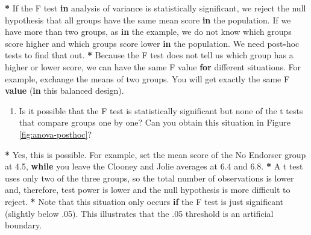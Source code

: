 \documentclass[a4paper]{book}
\newenvironment{Shaded}{\begin{snugshade}}{\end{snugshade}}
\newcommand{\KeywordTok}[1]{\textcolor[rgb]{0,0,0}{\textbf{#1}}}
\newcommand{\DecValTok}[1]{\textcolor[rgb]{0.00,0.00,0.00}{#1}}
\newcommand{\FloatTok}[1]{\textcolor[rgb]{0.00,0.00,0.00}{#1}}
\newcommand{\StringTok}[1]{\textcolor[rgb]{0.00,0.00,0.00}{#1}}
\newcommand{\ControlFlowTok}[1]{\textcolor[rgb]{0.00,0.00,0.00}{\textbf{#1}}}
\newcommand{\OperatorTok}[1]{\textcolor[rgb]{0.00,0.00,0.00}{\textbf{#1}}}
\newcommand{\NormalTok}[1]{#1}
\providecommand{\tightlist}{%
  \setlength{\itemsep}{0pt}\setlength{\parskip}{0pt}}
\theoremstyle{definition}
\theoremstyle{definition}
\theoremstyle{definition}
\theoremstyle{remark}
\begin{document}
\begin{Shaded}
\begin{Highlighting}[]
\OperatorTok{*}\StringTok{ }\NormalTok{If the F test }\ControlFlowTok{in}\NormalTok{ analysis of variance is statistically significant, we}
\NormalTok{reject the null hypothesis that all groups have the same mean score }\ControlFlowTok{in}\NormalTok{ the}
\NormalTok{population. If we have more than two groups, as }\ControlFlowTok{in}\NormalTok{ the example, we do not know}
\NormalTok{which groups score higher and which groups score lower }\ControlFlowTok{in}\NormalTok{ the population. We}
\NormalTok{need post}\OperatorTok{-}\NormalTok{hoc tests to find that out.}
\OperatorTok{*}\StringTok{ }\NormalTok{Because the F test does not tell us which group has a higher or lower score,}
\NormalTok{we can have the same F value }\ControlFlowTok{for}\NormalTok{ different situations. For example, exchange}
\NormalTok{the means of two groups. You will get exactly the same F }\KeywordTok{value}\NormalTok{ (}\ControlFlowTok{in}\NormalTok{ this}
\NormalTok{balanced design).}
\end{Highlighting}
\end{Shaded}

\begin{enumerate}
\def\labelenumi{\arabic{enumi}.}
\setcounter{enumi}{1}
\tightlist
\item
  Is it possible that the F test is statistically significant but none
  of the t tests that compare groups one by one? Can you obtain this
  situation in Figure \ref{fig:anova-posthoc}?
\end{enumerate}

\begin{Shaded}
\begin{Highlighting}[]
\OperatorTok{*}\StringTok{ }\NormalTok{Yes, this is possible. For example, set the mean score of the No Endorser}
\NormalTok{group at }\FloatTok{4.5}\NormalTok{, }\ControlFlowTok{while}\NormalTok{ you leave the Clooney and Jolie averages at }\FloatTok{6.4}\NormalTok{ and }\FloatTok{6.8}\NormalTok{.}
\OperatorTok{*}\StringTok{ }\NormalTok{A t test uses only two of the three groups, so the total number of}
\NormalTok{observations is lower and, therefore, test power is lower and the null}
\NormalTok{hypothesis is more difficult to reject.}
\OperatorTok{*}\StringTok{ }\NormalTok{Note that this situation only occurs }\ControlFlowTok{if}\NormalTok{ the F test is just significant}
\NormalTok{(slightly below .}\DecValTok{05}\NormalTok{). This illustrates that the .}\DecValTok{05}\NormalTok{ threshold is an artificial}
\NormalTok{boundary.}
\end{Highlighting}
\end{Shaded}
\end{document}
